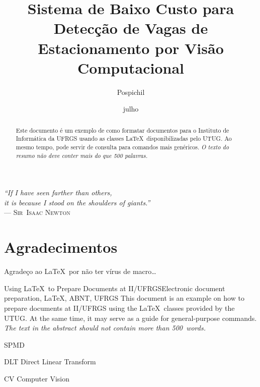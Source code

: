 \documentclass[ecp,tc]{iiufrgs}
\title{Sistema de Baixo Custo para Detecção de Vagas de Estacionamento por Visão Computacional}
\author{Pospichil}{Bruno Meybom}
\date{julho}{2015}
\begin{document}
\maketitle

\clearpage
\begin{flushright}
\mbox{}\vfill
{\sffamily\itshape
``If I have seen farther than others,\\
it is because I stood on the shoulders of giants.''\\}
--- \textsc{Sir~Isaac Newton}
\end{flushright}

\chapter*{Agradecimentos}
Agradeço ao \LaTeX\ por não ter vírus de macro\ldots



\begin{abstract}
Este documento é um exemplo de como formatar documentos para o
Instituto de Informática da UFRGS usando as classes \LaTeX\
disponibilizadas pelo UTUG\@. Ao mesmo tempo, pode servir de consulta
para comandos mais genéricos. \emph{O texto do resumo não deve
conter mais do que 500 palavras.}
\end{abstract}

\begin{englishabstract}{Using \LaTeX\ to Prepare Documents at II/UFRGS}{Electronic document preparation, \LaTeX, ABNT, UFRGS}
This document is an example on how to prepare documents at II/UFRGS
using the \LaTeX\ classes provided by the UTUG\@. At the same time, it
may serve as a guide for general-purpose commands. \emph{The text in
the abstract should not contain more than 500~words.}
\end{englishabstract}

\begin{listofabbrv}{SPMD}
        \item[DLT] Direct Linear Transform
        \item[CV] Computer Vision
  
\end{listofabbrv}
\end{document}
